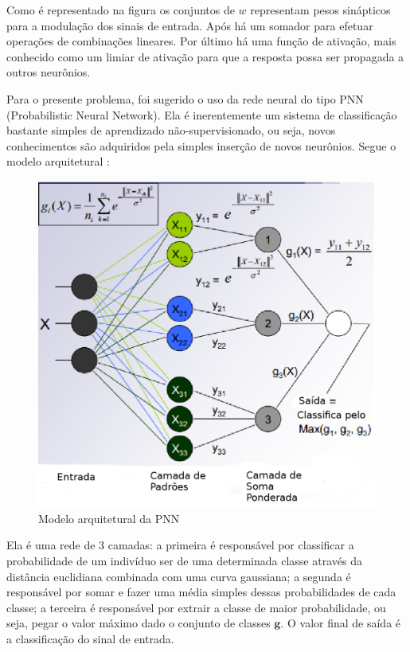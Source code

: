 Como é representado na figura os conjuntos de $w$ representam pesos sinápticos para a modulação dos sinais de entrada. Após há um somador para efetuar operações de combinações lineares. Por último há uma função de ativação, mais conhecido como um limiar de ativação para que a resposta possa ser propagada a outros neurônios.

\newpage
Para o presente problema, foi sugerido o uso da rede neural do tipo PNN (Probabilistic Neural Network). Ela é inerentemente um sistema de classificação bastante simples de aprendizado não-supervisionado, ou seja, novos conhecimentos são adquiridos pela simples inserção de novos neurônios. Segue o modelo arquitetural \cite{neuron-arq}:

\begin{figure}[h]
	\centering
		\includegraphics[scale=0.7]{figuras/PNN.eps}
	\caption{Modelo arquitetural da PNN}
\end{figure}

Ela é uma rede de 3 camadas: a primeira é responsável por classificar a probabilidade de um indivíduo ser de uma determinada classe através da distância euclidiana combinada com uma curva gaussiana; a segunda é responsável por somar e fazer uma média simples dessas probabilidades de cada classe; a terceira é responsável por extrair a classe de maior probabilidade, ou seja, pegar o valor máximo dado o conjunto de classes $\textbf{g}$. O valor final de saída é a classificação do sinal de entrada.